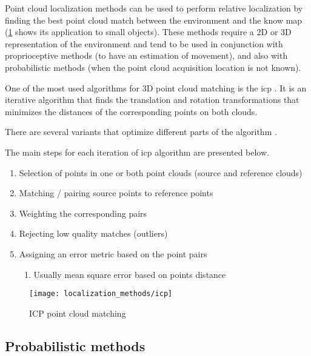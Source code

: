 Point cloud localization methods can be used to perform relative localization by finding the best point cloud match between the environment and the know map (\cref{fig:localization-methods_icp} shows its application to small objects). These methods require a 2D or 3D representation of the environment and tend to be used in conjunction with proprioceptive methods (to have an estimation of movement), and also with probabilistic methods (when the point cloud acquisition location is not known).

One of the most used algorithms for 3D point cloud matching is the \gls{icp} \cite{Besl1992,Jez2008,Zhang1992,Bouaziz2013,Chetverikov2002,Djehaich2013,Zhou2011}. It is an iterative algorithm that finds the translation and rotation transformations that minimizes the distances of the corresponding points on both clouds.

There are several variants that optimize different parts of the algorithm \cite{Rusinkiewicz2001}.

The main steps for each iteration of \gls{icp} algorithm are presented below.

\begin{enumerate}
\item  Selection of points in one or both point clouds (source and reference clouds)
\item  Matching / pairing source points to reference points
\item  Weighting the corresponding pairs
\item  Rejecting low quality matches (outliers)
\item  Assigning an error metric based on the point pairs

\begin{enumerate}
\item  Usually mean square error based on points distance
\end{enumerate}

\end{enumerate}


\begin{figure}[h]
	\centering
	\texttt{[image: localization\_methods/icp]}
	\caption{ICP point cloud matching\protect\footnotemark}
	\label{fig:localization-methods_icp}
\end{figure}


\subsection{Probabilistic methods}

